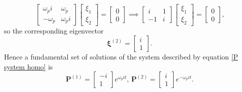 \documentclass{article}
\begin{document}
\begin{equation}
    \begin{bmatrix}
        \omega_p i & \omega_p \\
        -\omega_p & \omega_p i
    \end{bmatrix}
    \begin{bmatrix}
        \xi_1 \\ \xi_2
    \end{bmatrix} =
    \begin{bmatrix}
        0 \\ 0
    \end{bmatrix} \implies
    \begin{bmatrix}
        i & 1 \\
        -1 & i
    \end{bmatrix}
    \begin{bmatrix}
        \xi_1 \\ \xi_2
    \end{bmatrix} =
    \begin{bmatrix}
        0 \\ 0
    \end{bmatrix}\text{,}
\end{equation}
so the corresponding eigenvector
\begin{equation}
    \pmb{\xi}^{(2)} = 
    \begin{bmatrix}
        i \\ 1
    \end{bmatrix}\text{.}
\end{equation}
Hence a fundamental set of solutions of the system described by equation \ref{P system homo} is
\begin{equation}
    \mathbf{P}^{(1)} = 
    \begin{bmatrix}
        -i \\ 1
    \end{bmatrix}
    e^{\omega_pit}\text{, }
    \mathbf{P}^{(2)} = 
    \begin{bmatrix}
        i \\ 1
    \end{bmatrix}
    e^{-\omega_pit}\text{.}
\end{equation}
\end{document}
